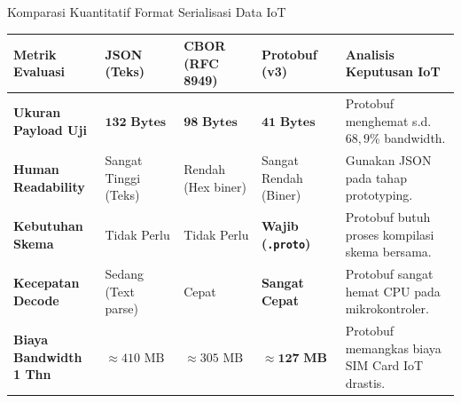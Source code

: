 \documentclass[aspectratio=169,10pt]{beamer}
\begin{document}
\begin{frame}{Komparasi Kuantitatif Format Serialisasi Data IoT}
    \small
    \begin{tabularx}{\textwidth}{l C{2.2cm} C{2.2cm} C{2.2cm} X}
        \toprule
        \textbf{Metrik Evaluasi} & \textbf{JSON (Teks)} & \textbf{CBOR (RFC 8949)} & \textbf{Protobuf (v3)} & \textbf{Analisis Keputusan IoT} \\
        \midrule
        \textbf{Ukuran Payload Uji} & $\mathbf{132\text{ Bytes}}$ & $\mathbf{98\text{ Bytes}}$ & $\mathbf{41\text{ Bytes}}$ & Protobuf menghemat s.d. $68{,}9\%$ bandwidth. \\
        \addlinespace
        \textbf{Human Readability} & Sangat Tinggi (Teks) & Rendah (Hex biner) & Sangat Rendah (Biner) & Gunakan JSON pada tahap prototyping. \\
        \addlinespace
        \textbf{Kebutuhan Skema} & Tidak Perlu & Tidak Perlu & \textbf{Wajib (\texttt{.proto})} & Protobuf butuh proses kompilasi skema bersama. \\
        \addlinespace
        \textbf{Kecepatan Decode} & Sedang (Text parse) & Cepat & \textbf{Sangat Cepat} & Protobuf sangat hemat CPU pada mikrokontroler. \\
        \addlinespace
        \textbf{Biaya Bandwidth 1 Thn} & $\approx 410\text{ MB}$ & $\approx 305\text{ MB}$ & $\approx \mathbf{127\text{ MB}}$ & Protobuf memangkas biaya SIM Card IoT drastis. \\
        \bottomrule
    \end{tabularx}
\end{frame}
\end{document}

